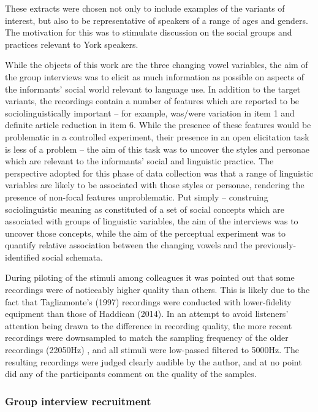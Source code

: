 \documentclass{article}
\begin{document}
\newpage

These extracts were chosen not only to include examples of the variants of interest, but also to be representative of speakers of a range of ages and genders. The motivation for this was to stimulate discussion on the social groups and practices relevant to York speakers.

 While the objects of this work are the three changing vowel variables, the aim of the group interviews was to elicit as much information as possible on aspects of the informants' social world relevant to language use. In addition to the target variants, the recordings contain a number of features which are reported to be sociolinguistically important -- for example, was/were variation in item 1 and definite article reduction in item 6. While the presence of these features would be problematic in a controlled experiment, their presence in an open elicitation task is less of a problem -- the aim of this task was to uncover the styles and personae which are relevant to the informants' social and linguistic practice. The perspective adopted for this phase of data collection was that a range of linguistic variables are likely to be associated with those styles or personae, rendering the presence of non-focal features unproblematic. Put simply -- construing sociolinguistic meaning as constituted of a set of social concepts which are associated with groups of linguistic variables, the aim of the interviews was to uncover those concepts, while the aim of the perceptual experiment was to quantify relative association between the changing vowels and the previously-identified social schemata.

During piloting of the stimuli among colleagues it was pointed out that some recordings were of noticeably higher quality than others. This is likely due to the fact that Tagliamonte's (1997) recordings were conducted with lower-fidelity equipment than those of Haddican (2014). In an attempt to avoid listeners' attention being drawn to the difference in recording quality, the more recent recordings were downsampled to match the sampling frequency of the older recordings (22050Hz) , and all stimuli were low-passed filtered to 5000Hz. The resulting recordings were judged clearly audible by the author, and at no point did any of the participants comment on the quality of the samples.


\newpage
\subsubsection*{Group interview recruitment}
\end{document}
